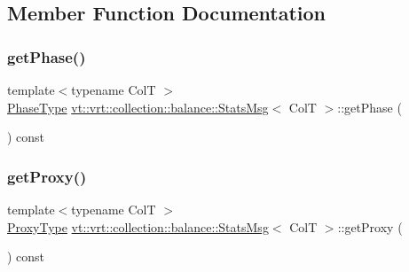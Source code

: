 \subsection{Member Function Documentation}
\mbox{\label{structvt_1_1vrt_1_1collection_1_1balance_1_1_stats_msg_a81328064a6ff12f8ae9629bdb400836e}} 
\subsubsection{\texorpdfstring{get\+Phase()}{getPhase()}}
{\footnotesize\ttfamily template$<$typename ColT $>$ \\
\hyperlink{namespacevt_a46ce6733d5cdbd735d561b7b4029f6d7}{Phase\+Type} \hyperlink{structvt_1_1vrt_1_1collection_1_1balance_1_1_stats_msg}{vt\+::vrt\+::collection\+::balance\+::\+Stats\+Msg}$<$ ColT $>$\+::get\+Phase (\begin{DoxyParamCaption}{ }\end{DoxyParamCaption}) const\hspace{0.3cm}{\ttfamily [inline]}}

\mbox{\label{structvt_1_1vrt_1_1collection_1_1balance_1_1_stats_msg_ad6c41dfbee2143acc207716115023933}} 
\subsubsection{\texorpdfstring{get\+Proxy()}{getProxy()}}
{\footnotesize\ttfamily template$<$typename ColT $>$ \\
\hyperlink{structvt_1_1vrt_1_1collection_1_1balance_1_1_stats_msg_a6f88a58947e0a02b3f7dcfec8b91b5fd}{Proxy\+Type} \hyperlink{structvt_1_1vrt_1_1collection_1_1balance_1_1_stats_msg}{vt\+::vrt\+::collection\+::balance\+::\+Stats\+Msg}$<$ ColT $>$\+::get\+Proxy (\begin{DoxyParamCaption}{ }\end{DoxyParamCaption}) const\hspace{0.3cm}{\ttfamily [inline]}}

